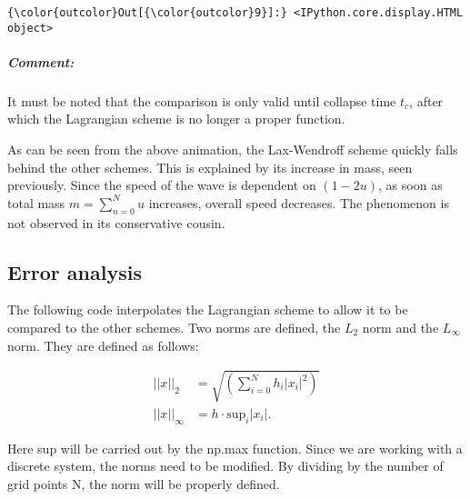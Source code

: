 \documentclass[11pt]{article}
\begin{document}
\begin{Verbatim}[commandchars=\\\{\}]
{\color{outcolor}Out[{\color{outcolor}9}]:} <IPython.core.display.HTML object>
\end{Verbatim}
            
    \subparagraph{Comment:}\label{comment}

It must be noted that the comparison is only valid until collapse time
\(t_c\), after which the Lagrangian scheme is no longer a proper
function.

As can be seen from the above animation, the Lax-Wendroff scheme quickly
falls behind the other schemes. This is explained by its increase in
mass, seen previously. Since the speed of the wave is dependent on
\((1-2u)\), as soon as total mass \(m = \sum_{n=0}^N u\) increases,
overall speed decreases. The phenomenon is not observed in its
conservative cousin.

    \subsection{Error analysis}\label{error-analysis}

The following code interpolates the Lagrangian scheme to allow it to be
compared to the other schemes. Two norms are defined, the \(L_2\) norm
and the \(L_\infty\) norm. They are defined as follows:

\begin{align}
    ||x||_2 &= \sqrt{\left(\sum_{i=0}^N h_i |x_i|^2\right)} \\
    ||x||_\infty &= h\cdot \text{sup}_i|x_i|.
\end{align}

Here sup will be carried out by the np.max function. Since we are
working with a discrete system, the norms need to be modified. By
dividing by the number of grid points N, the norm will be properly
defined.
\end{document}
